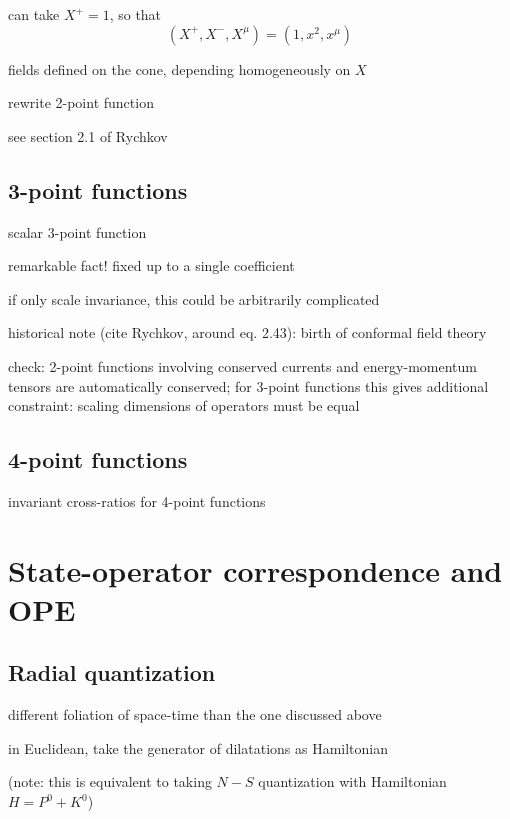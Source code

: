 \documentclass[a4paper,12pt]{article}
\numberwithin{equation}{section}
\begin{document}
can take $X^+ = 1$, so that
\begin{equation}
	(X^+, X^-, X^\mu) = (1, x^2, x^\mu)
\end{equation}


fields defined on the cone, depending homogeneously on $X$

rewrite 2-point function


see section 2.1 of Rychkov

\subsection{3-point functions}

scalar 3-point function

remarkable fact! fixed up to a single coefficient

if only scale invariance, this could be arbitrarily complicated

historical note (cite Rychkov, around eq. 2.43): birth of conformal field theory


check: 2-point functions involving conserved currents and energy-momentum tensors are automatically conserved; for 3-point functions this gives additional constraint: scaling dimensions of operators must be equal



\subsection{4-point functions}

invariant cross-ratios for 4-point functions


\section{State-operator correspondence and OPE}


\subsection{Radial quantization}

different foliation of space-time than the one discussed above

in Euclidean, take the generator of dilatations as Hamiltonian


(note: this is equivalent to taking $N-S$ quantization with Hamiltonian $H = P^0 + K^0$)
\end{document}

